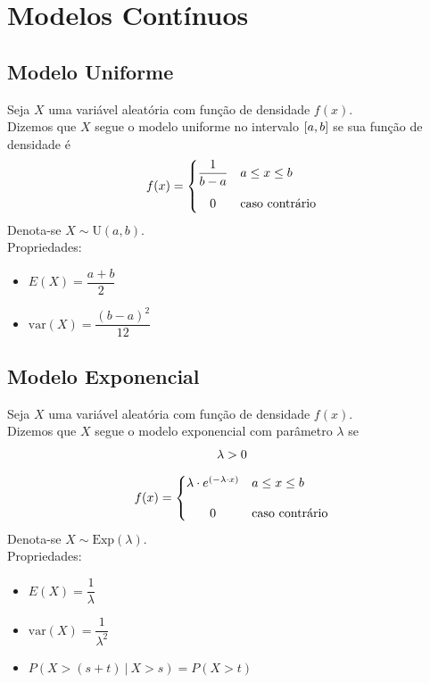 \documentclass{article}
\begin{document}
\section{Modelos Contínuos}


\subsection{Modelo Uniforme}
Seja $X$ uma variável aleatória com função de densidade $f(x)$. \\
Dizemos que $X$ segue o modelo uniforme no intervalo $[a,b\hspace{0.1pt}]$ se sua função de densidade é
\[
  f(x) = \begin{cases}
          \dfrac{1}{b - a} & a \leq x \leq b \\[10pt]
          \hfil 0 & \text{caso contrário}
         \end{cases} \\[10pt]
\]
Denota-se $X \sim \text{U}(a, b)$. \\[10pt]
Propriedades:
\begin{itemize}
  \item $E(X) = \dfrac{a + b}{2}$
  \item $\text{var}(X) = \dfrac{{(b - a)}^2}{12}$
\end{itemize}


\subsection{Modelo Exponencial}
Seja $X$ uma variável aleatória com função de densidade $f(x)$. \\
Dizemos que $X$ segue o modelo exponencial com parâmetro $\lambda$ se
\begin{gather*}
  \lambda > 0 \\[5pt]
  f(x) = \begin{cases}
          \lambda \cdot e^{(-\lambda \cdot x)} &a \leq x \leq b \\[10pt]
          \hfil 0 &\text{caso contrário}
         \end{cases}
\end{gather*}
Denota-se $X \sim \text{Exp}(\lambda)$. \\[10pt]
Propriedades:
\begin{itemize}
  \item $E(X) = \dfrac{1}{\lambda}$
  \item $\text{var}(X) = \dfrac{1}{\lambda^2}$
  \item $P\left(X > (s + t) \:\big|\: X > s \right) = P(X > t)$
\end{itemize}
\end{document}
